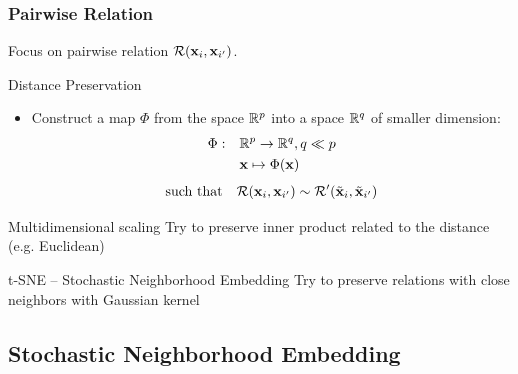\documentclass{beamer}\usepackage[]{graphicx}\usepackage[]{color}
\begin{document}
\begin{frame}
    \frametitle{Pairwise Relation}

    Focus on pairwise relation $\mathcal{R}(\mathbf{x}_i, \mathbf{x}_{i'})$.

    \begin{block}{Distance Preservation}
      \begin{itemize}
    \item  Construct a map $\Phi$ from the space $\mathbb{R}^{p}$ into a space $\mathbb{R}^{q}$ of \alert{smaller dimension}:
      \begin{align*}
      \Phi:\quad & \mathbb{R}^p \to \mathbb{R}^{q}, q \ll p\\
               & \mathbf{x} \mapsto \Phi(\mathbf{x})
      \end{align*}
      \begin{equation*}
      \text{such that} \quad \mathcal{R}(\mathbf{x}_i, \mathbf{x}_{i'}) \sim\mathcal{R'}(\tilde{\mathbf{x}}_i, \tilde{\mathbf{x}}_{i'})
      \end{equation*}
    \end{itemize}
  \end{block}

  \begin{block}{Multidimensional scaling}
    Try to preserve inner product related to the distance (e.g. Euclidean)
  \end{block}

  \vfill

  \begin{block}{t-SNE -- Stochastic Neighborhood Embedding}
    Try to preserve relations with close neighbors with Gaussian kernel
  \end{block}

\end{frame}


\subsection{Stochastic Neighborhood Embedding}
\end{document}
